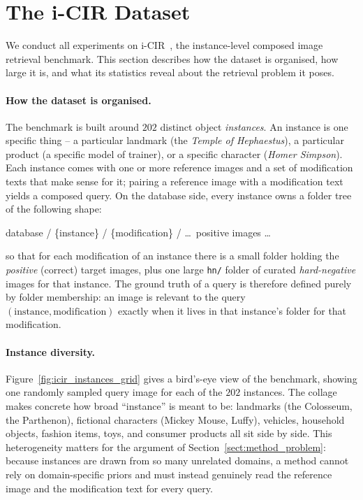 \section{The i-CIR Dataset}\label{sect:method_dataset}

We conduct all experiments on i-CIR~\cite{psomas2025icir}, the instance-level
composed image retrieval benchmark. This section describes how the dataset is
organised, how large it is, and what its statistics reveal about the retrieval
problem it poses.

\paragraph{How the dataset is organised.}
The benchmark is built around $202$ distinct object \emph{instances}. An instance
is one specific thing -- a particular landmark (the \emph{Temple of Hephaestus}),
a particular product (a specific model of trainer), or a specific character
(\emph{Homer Simpson}). Each instance comes with one or more reference images and
a set of modification texts that make sense for it; pairing a reference image with
a modification text yields a composed query. On the database side, every instance
owns a folder tree of the following shape:
\begin{center}
\ttfamily database / \{instance\} / \{modification\} / \dots\ positive images \dots
\end{center}
so that for each modification of an instance there is a small folder holding the
\emph{positive} (correct) target images, plus one large \texttt{hn/} folder of
curated \emph{hard-negative} images for that instance. The ground truth of a query
is therefore defined purely by folder membership: an image is relevant to the
query $(\text{instance}, \text{modification})$ exactly when it lives in that
instance's folder for that modification.

\paragraph{Instance diversity.}
Figure~\ref{fig:icir_instances_grid} gives a bird's-eye view of the benchmark,
showing one randomly sampled query image for each of the $202$ instances. The
collage makes concrete how broad ``instance'' is meant to be: landmarks
(the Colosseum, the Parthenon), fictional characters (Mickey Mouse, Luffy),
vehicles, household objects, fashion items, toys, and consumer products all sit
side by side. This heterogeneity matters for the argument of
Section~\ref{sect:method_problem}: because instances are drawn from so many
unrelated domains, a method cannot rely on domain-specific priors and must
instead genuinely read the reference image and the modification text for every
query.

